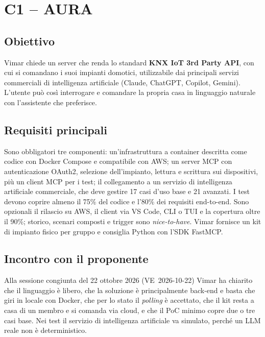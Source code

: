 
\section{C1 -- AURA}\label{sec:c1}

\begin{scheda}
\end{scheda}

\subsection{Obiettivo}
Vimar chiede un server  che renda lo standard \textbf{KNX IoT 3rd
Party API}, con cui si comandano i suoi impianti domotici, utilizzabile dai
principali servizi commerciali di intelligenza artificiale (Claude,
ChatGPT, Copilot, Gemini). L'utente può così interrogare e comandare la
propria casa in linguaggio naturale con l'assistente che preferisce.

\subsection{Requisiti principali}
Sono obbligatori tre componenti: un'infrastruttura a container descritta
come codice con Docker Compose e compatibile con AWS; un server MCP con
autenticazione OAuth2, selezione dell'impianto, lettura e scrittura sui
dispositivi, più un client MCP per i test; il collegamento a un servizio
di intelligenza artificiale commerciale, che deve gestire 17 casi d'uso
base e 21 avanzati. I test devono coprire almeno il 75\% del codice e
l'80\% dei requisiti end-to-end. Sono opzionali il rilascio su AWS, il
client via VS Code, CLI o TUI e la copertura oltre il 90\%; storico,
scenari composti e trigger sono \emph{nice-to-have}. Vimar fornisce un kit
di impianto fisico per gruppo e consiglia Python con l'SDK FastMCP.

\subsection{Incontro con il proponente}
Alla sessione congiunta del 22 ottobre 2026 (VE~2026-10-22) Vimar ha
chiarito che il linguaggio è libero, che la soluzione è principalmente
back-end e basta che giri in locale con Docker, che per lo stato il
\emph{polling} è accettato, che il kit resta a casa di un membro e si
comanda via cloud, e che il PoC minimo copre due o tre casi base. Nei test
il servizio di intelligenza artificiale va simulato, perché un LLM reale
non è deterministico.

